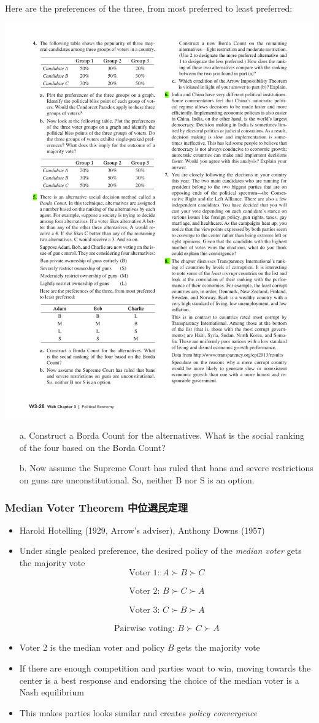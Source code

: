 \documentclass[12pt, xcolor=dvipsnames]{beamer}
\begin{document}
\begin{frame}
\small Here are the preferences of the three, from most preferred to least preferred:
\begin{center}
\includegraphics[width=.7\linewidth]{figures/w3-5.pdf}
\end{center}
\begin{enumerate}\itemsep-0.5ex 
\item[a.] Construct a Borda Count for the alternatives. What is the social ranking of the four based on the Borda Count?
\item[b.] Now assume the Supreme Court has ruled that bans and severe restrictions on guns are unconstitutional. So, neither B nor S is an option.
\end{enumerate}
\end{frame}


\begin{frame}
\frametitle{\bf Median Voter Theorem 中位選民定理}
\begin{itemize}
\item Harold Hotelling (1929, Arrow's adviser), Anthony Downs (1957)
\item Under single peaked preference, the desired policy of the {\it median voter} gets the majority vote
\[\mbox{Voter 1: }A\succ B \succ C\]\\[-9.5mm]
\[\mbox{Voter 2: }B\succ C \succ A\]\\[-8mm]
\[\mbox{Voter 3: }C\succ B \succ A\]\\[-8mm]
\[\mbox{Pairwise voting: }B\succ C \succ A\]
\item Voter 2 is the median voter and policy $B$ gets the majority vote
\item If there are enough competition and parties want to win, moving towards the center is a best response and endorsing the choice of the median voter is a Nash equilibrium
\item This makes parties looks similar and creates {\it policy convergence}
\end{itemize}
\end{frame}
\end{document}
